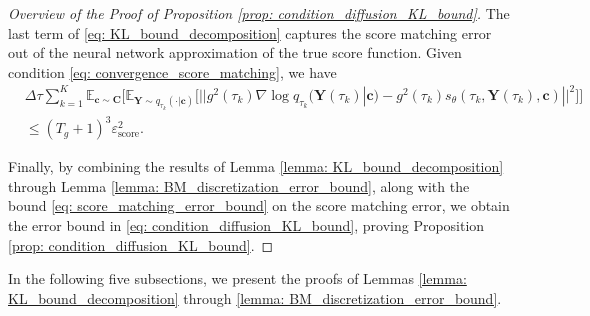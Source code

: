 \documentclass[11pt]{article}
\newcommand{\mE}{\mathbb{E}}
\newcommand{\bY}{\mathbf{Y}}
\newcommand{\bc}{\mathbf{c}}
\newcommand{\bC}{\mathbf{C}}
\begin{document}
\begin{proof}[Overview of the Proof of Proposition \ref{prop: condition_diffusion_KL_bound}]
The last term of \eqref{eq: KL_bound_decomposition} captures the score matching error out of the neural network approximation of the true score function.
Given condition \eqref{eq: convergence_score_matching}, we have
\begin{align}
    &\Delta \tau\sum_{k=1}^{K}\mE_{\bc\sim\bC}\bigg[\mE_{\bY\sim q_{\tau_k}(\cdot | \bc)}\big[||g^2(\tau_k)\nabla\log q_{\tau_k}(\bY(\tau_k) | \bc) - g^2(\tau_k)s_\theta(\tau_k, \bY(\tau_k), \bc)||^2\big]\bigg]\nonumber\\
    &\le (T_g + 1)^3\varepsilon_{\text{score}}^2. \label{eq: score_matching_error_bound}
\end{align}

Finally, by combining the results of Lemma \ref{lemma: KL_bound_decomposition} through Lemma \ref{lemma: BM_discretization_error_bound}, along with the bound \eqref{eq: score_matching_error_bound} on the score matching error, we obtain the error bound in \eqref{eq: condition_diffusion_KL_bound}, proving Proposition \ref{prop: condition_diffusion_KL_bound}.
\end{proof}

In the following five subsections, we present the proofs of Lemmas \ref{lemma: KL_bound_decomposition} through \ref{lemma: BM_discretization_error_bound}.
\end{document}
